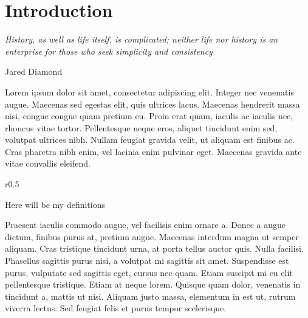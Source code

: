 \chapter{Introduction}
\epigraph{\emph{History, as well as life itself, is complicated; neither life nor history is an enterprise for those who seek simplicity and consistency}}{Jared Diamond}


Lorem ipsum dolor sit amet, consectetur adipiscing elit. Integer nec venenatis augue. Maecenas sed egestas elit, quis ultrices lacus. Maecenas hendrerit massa nisi, congue congue quam pretium eu. Proin erat quam, iaculis ac iaculis nec, rhoncus vitae tortor. Pellentesque neque eros, aliquet tincidunt enim sed, volutpat ultrices nibh. Nullam feugiat gravida velit, ut aliquam est finibus ac. Cras pharetra nibh enim, vel lacinia enim pulvinar eget. Maecenas gravida ante vitae convallis eleifend.

\begin{wrapfigure}{r}{0.5\textwidth}
  \vspace{-20pt}
  \begin{center}
        \begin{definitions}
        Here will be my definitions
        \end{definitions}  
  \end{center}
  \vspace{-20pt}
\end{wrapfigure}

Praesent iaculis commodo augue, vel facilisis enim ornare a. Donec a augue dictum, finibus purus at, pretium augue. Maecenas interdum magna ut semper aliquam. Cras tristique tincidunt urna, at porta tellus auctor quis. Nulla facilisi. Phasellus sagittis purus nisi, a volutpat mi sagittis sit amet. Suspendisse est purus, vulputate sed sagittis eget, cursus nec quam. Etiam suscipit mi eu elit pellentesque tristique. Etiam at neque lorem. Quisque quam dolor, venenatis in tincidunt a, mattis ut nisi. Aliquam justo massa, elementum in est ut, rutrum viverra lectus. Sed feugiat felis et purus tempor scelerisque.

\clearpage
%

%  
